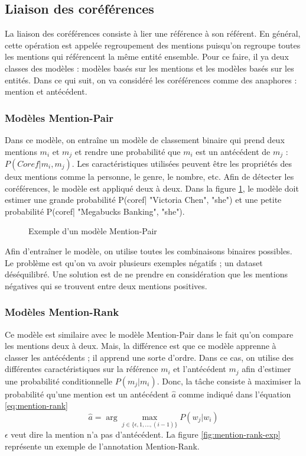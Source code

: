 \documentclass{KodeBook}
\begin{document}
\subsection{Liaison des coréférences}

La liaison des coréférences consiste à lier une référence à son référent. 
En général, cette opération est appelée regroupement des mentions puisqu'on regroupe toutes les mentions qui référencent la même entité ensemble. 
Pour ce faire, il ya deux classes des modèles : modèles basés sur les mentions et les modèles basés sur les entités. 
Dans ce qui suit, on va considéré les coréférences comme des anaphores : mention et antécédent.

\subsubsection{Modèles Mention-Pair}

Dans ce modèle, on entraîne un modèle de classement binaire qui prend deux mentions $m_i$ et $m_j$ et rendre une probabilité que $m_i$ est un antécédent de $m_j$ : $P(Coref|m_i, m_j)$. 
Les caractéristiques utilisées peuvent être les propriétés des deux mentions comme la personne, le genre, le nombre, etc.
Afin de détecter les coréférences, le modèle est appliqué deux à deux.
Dans la figure \ref{fig:mention-pair-exp}, le modèle doit estimer une grande probabilité P(coref| "Victoria Chen", "she") et une petite probabilité P(coref| "Megabucks Banking", "she").

\begin{figure}[ht]
	\centering
	\caption[Exemple d'un modèle Mention-Pair]{Exemple d'un modèle Mention-Pair \cite{2019-jurafsky-martin}}
	\label{fig:mention-pair-exp}
\end{figure}

Afin d'entraîner le modèle, on utilise toutes les combinaisons binaires possibles.
Le problème est qu'on va avoir plusieurs exemples négatifs ; un dataset déséquilibré. 
Une solution est de ne prendre en considération que les mentions négatives qui se trouvent entre deux mentions positives.

\subsubsection{Modèles Mention-Rank}

Ce modèle est similaire avec le modèle Mention-Pair dans le fait qu'on compare les mentions deux à deux. 
Mais, la différence est que ce modèle apprenne à classer les antécédents ; il apprend une sorte d'ordre. 
Dans ce cas, on utilise des différentes caractéristiques sur la référence $m_i$ et l'antécédent $m_j$ afin d'estimer une probabilité conditionnelle $P(m_j|m_i)$.
Donc, la tâche consiste à maximiser la probabilité qu'une mention est un antécédent $\hat{a}$ comme indiqué dans l'équation \ref{eq:mention-rank}
\begin{equation}\label{eq:mention-rank}
\hat{a} = \arg\max_{j \in \{\epsilon, 1, \ldots, (i-1)\}} P(w_j|w_i) 
\end{equation}
$\epsilon$ veut dire la mention n'a pas d'antécédent. 
La figure \ref{fig:mention-rank-exp} représente un exemple de l'annotation Mention-Rank.
\end{document}
